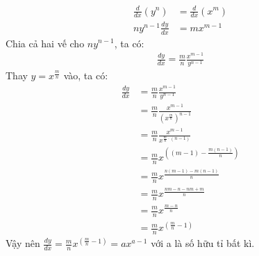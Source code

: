 \documentclass[15pt,a4paper]{article}
\begin{document}
\begin{align*}
	\frac{d}{dx}(y^n) &= \frac{d}{dx}(x^m)\\
	n y^{n-1} \frac{dy}{dx} &= m x^{m-1}
\end{align*}
Chia cả hai vế cho $n y^{n-1}$, ta có:
\begin{align*}
	\frac{dy}{dx} = \frac{m}{n} \frac{x^{m-1}}{y^{n-1}}
\end{align*}
Thay $y = x^{\frac{m}{n}}$ vào, ta có:
\begin{align*}
	\frac{dy}{dx} &= \frac{m}{n} \frac{x^{m-1}}{y^{n-1}}\\
	&= \frac{m}{n} \frac{x^{m-1}}{(x^{\frac{m}{n}})^{n-1}}\\
	&= \frac{m}{n} \frac{x^{m-1}}{x^{\frac{m}{n} \cdot (n-1)}}\\
	&= \frac{m}{n} x^{\left((m-1) - \frac{m (n-1)}{n}\right)}\\
	&= \frac{m}{n} x^{\frac{n (m-1) - m (n-1)}{n}}\\
	&= \frac{m}{n} x^{\frac{nm - n - nm + m}{n}}\\
	&= \frac{m}{n} x^{\frac{m - n}{n}}\\
	&= \frac{m}{n} x^{\left(\frac{m}{n} - 1\right)}
\end{align*}
Vậy nên $\frac{dy}{dx} = \frac{m}{n} x^{\left(\frac{m}{n} - 1\right)} = a x^{a - 1}$ với a là số hữu tỉ bất kì.
\end{document}
